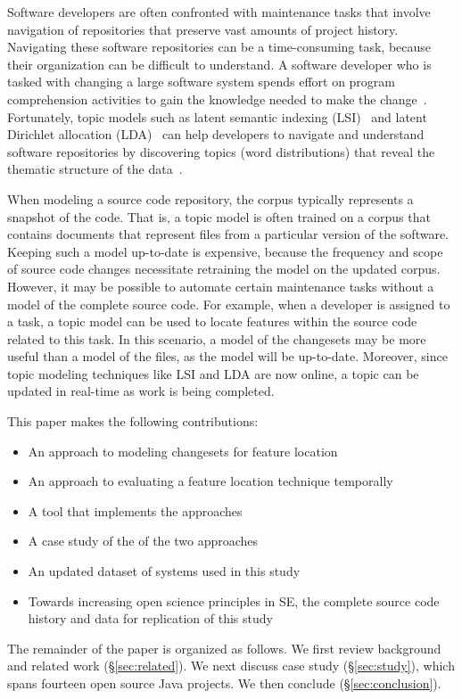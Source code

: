 %

Software developers are often confronted with maintenance tasks that involve navigation of repositories that preserve vast amounts of project history.
Navigating these software repositories can be a time-consuming task, because their organization can be difficult to understand.
A software developer who is tasked with changing a large software system spends effort on program comprehension activities to gain the knowledge needed to make the change~\cite{Corbi:1989}.
Fortunately, topic models such as
latent semantic indexing (LSI)~\cite{Deerwester:1990} and
latent Dirichlet allocation (LDA)~\cite{Blei-etal:2003}
can help developers to navigate and understand software repositories
by discovering topics (word distributions) that reveal the thematic structure of the data~\cite{Linstead-etal:2007,Thomas-etal:2011,Hindle_etal:2012}.


When modeling a source code repository, the corpus typically represents a snapshot of the code.
That is, a topic model is often trained on a corpus that contains documents that represent files from a particular version of the software.
Keeping such a model up-to-date is expensive, because the frequency and scope of source code changes necessitate retraining the model on the updated corpus.
However, it may be possible to automate certain maintenance tasks without a model of the complete source code.
For example, when a developer is assigned to a task, a topic model can be used to locate features within the source code related to this task.
In this scenario, a model of the changesets may be more useful than a model of the files, as the model will be up-to-date.
Moreover, since topic modeling techniques like LSI and LDA are now online, a topic can be updated in real-time as work is being completed.

This paper makes the following contributions:

\begin{itemize}
    \item An approach to modeling changesets for feature location
    \item An approach to evaluating a feature location technique temporally
    \item A tool that implements the approaches
    \item A case study of the of the two approaches
    \item An updated dataset of systems used in this study
    \item Towards increasing open science principles in SE,
        the complete source code history and data for replication of this study
\end{itemize}

The remainder of the paper is organized as follows.
We first review background and related work (\S\ref{sec:related}).
We next discuss case study (\S\ref{sec:study}), which spans fourteen open source Java projects. %
We then conclude (\S\ref{sec:conclusion}).
